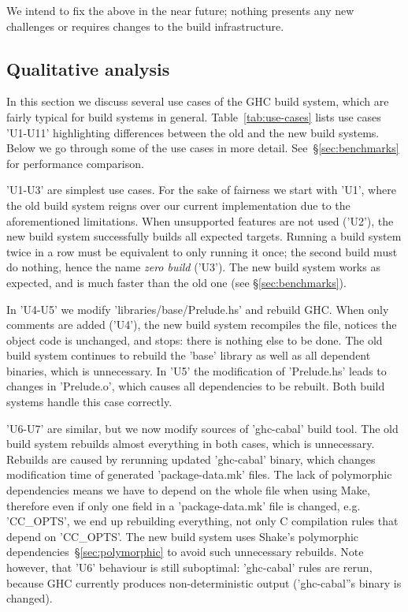 \noindent We intend to fix the above in the near future; nothing presents any
new challenges or requires changes to the build infrastructure.

\subsection{Qualitative analysis\label{sec:use-cases}}

In this section we discuss several use cases of the GHC build system, which
are fairly typical for build systems in general. Table~\ref{tab:use-cases}
lists use cases \lst'U1-U11' highlighting differences between the old and the
new build systems. Below we go through some of the use cases in more detail.
See~\S\ref{sec:benchmarks} for performance comparison.

\lst'U1-U3' are simplest use cases. For the sake of fairness we start with
\lst'U1', where the old build system reigns over our current implementation due
to the aforementioned limitations. When unsupported features are not used
(\lst'U2'), the new build system successfully builds all expected targets.
Running a build system twice in a row must be equivalent to only running it
once; the second build must do nothing, hence the name \emph{zero
build} (\lst'U3'). The new build system works as expected, and is much faster
than the old one (see \S\ref{sec:benchmarks}).


In \lst'U4-U5' we modify \lst'libraries/base/Prelude.hs' and rebuild GHC.
When only comments are added (\lst'U4'), the new build system recompiles the
file, notices the object code is unchanged, and stops: there is nothing else to
be done. The old build system continues to rebuild the \lst'base' library as
well as all dependent binaries, which is unnecessary. In \lst'U5' the
modification of \lst'Prelude.hs' leads to changes in \lst'Prelude.o', which
causes all dependencies to be rebuilt. Both build systems handle this case
correctly.

\lst'U6-U7' are similar, but we now modify sources of \lst'ghc-cabal' build
tool. The old build system rebuilds almost everything in both cases,
which is unnecessary. Rebuilds are caused by rerunning updated \lst'ghc-cabal'
binary, which changes modification time of generated \lst'package-data.mk'
files. The lack of polymorphic dependencies means we have to depend on the whole
file when using Make, therefore even if only one field in a
\lst'package-data.mk' file is changed, e.g. \lst'CC_OPTS', we end up
rebuilding everything, not only C compilation rules that depend on
\lst'CC_OPTS'. The new build system uses Shake's polymorphic
dependencies~\S\ref{sec:polymorphic} to avoid such unnecessary rebuilds. Note
however, that \lst'U6' behaviour is still suboptimal: \lst'ghc-cabal' rules
are rerun, because GHC currently produces non-deterministic output
(\lst'ghc-cabal''s binary is changed).

